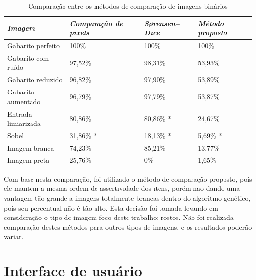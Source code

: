 \documentclass[12pt,oneside,a4paper,english,french,spanish,brazil,]{abntex2}
\begin{document}
\begin{table}
\centering
\caption{Comparação entre os métodos de comparação de imagens binários}
\label{tab:ComparacaoImagens}
\begin{tabular}{llll}
\hline
\textit{\textbf{Imagem}} & \textit{\textbf{Comparação de pixels}} & \textit{\textbf{Sørensen–Dice}} & \textit{\textbf{Método proposto}} \\ \hline
Gabarito perfeito        & 100\%                                  & 100\%                           & 100\%                             \\
Gabarito com ruído       & 97,52\%                                & 98,31\%                         & 53,93\%                           \\
Gabarito reduzido        & 96,82\%                                & 97,90\%                         & 53,89\%                           \\
Gabarito aumentado       & 96,79\%                                & 97,79\%                         & 53,87\%                           \\
Entrada limiarizada      & 80,86\%                                & 80,86\% *                       & 24,67\%                            \\
Sobel                    & 31,86\% *                              & 18,13\% *                       & 5,69\% *                          \\
Imagem branca            & 74,23\%                                & 85,21\%                         & 13,77\%                           \\
Imagem preta             & 25,76\%                                & 0\%                             & 1,65\% \\ \hline
\end{tabular}
\end{table}

Com base nesta comparação, foi utilizado o método de comparação proposto, pois ele mantém a mesma ordem de  assertividade dos itens, porém não dando uma vantagem tão grande a imagens totalmente brancas dentro do algoritmo genético, pois seu percentual não é tão alto. Esta decisão foi tomada levando em consideração o tipo de imagem foco deste trabalho: rostos. Não foi realizada comparação destes métodos para outros tipos de imagens, e os resultados poderão variar.

\section{Interface de usuário}
\end{document}
